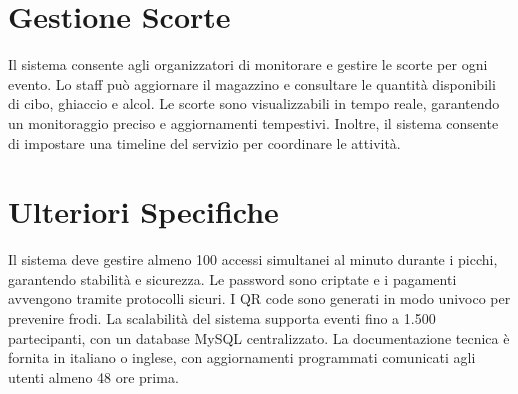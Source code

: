 \documentclass[a4paper]{article}
\begin{document}
\section*{\textcolor{sectioncolor}{Gestione Scorte}}
\textcolor{textcolor}{
Il sistema consente agli organizzatori di monitorare e gestire le scorte per ogni evento. Lo staff può aggiornare il magazzino e consultare le quantità disponibili di cibo, ghiaccio e alcol. Le scorte sono visualizzabili in tempo reale, garantendo un monitoraggio preciso e aggiornamenti tempestivi. Inoltre, il sistema consente di impostare una timeline del servizio per coordinare le attività.
}

\section*{\textcolor{sectioncolor}{Ulteriori Specifiche}}
\textcolor{textcolor}{
Il sistema deve gestire almeno 100 accessi simultanei al minuto durante i picchi, garantendo stabilità e sicurezza. Le password sono criptate e i pagamenti avvengono tramite protocolli sicuri. I QR code sono generati in modo univoco per prevenire frodi. La scalabilità del sistema supporta eventi fino a 1.500 partecipanti, con un database MySQL centralizzato. La documentazione tecnica è fornita in italiano o inglese, con aggiornamenti programmati comunicati agli utenti almeno 48 ore prima.
}
\end{document}
